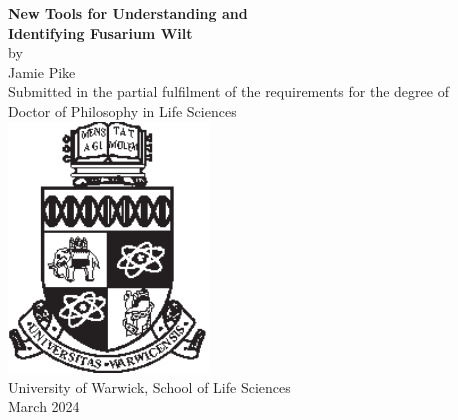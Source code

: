 \begin{titlepage}
    \begin{center}
        \singlespacing
        \Huge
        \textbf{New Tools for Understanding and } \\
        \vspace*{0.5cm}
        \textbf{Identifying Fusarium Wilt} \\
        \vspace*{1.8cm}
        \normalsize
        by \\ 
        \vspace*{0.2cm}
        \LARGE
        Jamie Pike\\ 
        \vfill
        \normalsize
        Submitted in the partial fulfilment of the requirements for the degree of \\
        \Large
        \vspace*{0.3cm}
        Doctor of Philosophy in Life Sciences \\
        \vspace*{1cm}
        \includegraphics[width=0.4\textwidth]{Preamble/crest_black.eps} \\
        \vspace*{1cm}
        \large
        University of Warwick, School of Life Sciences\\
        \vspace*{0.5cm}
        \normalsize
        March 2024 \\
         \vspace*{1cm}   
    \end{center}
    \clearpage
\end{titlepage}
